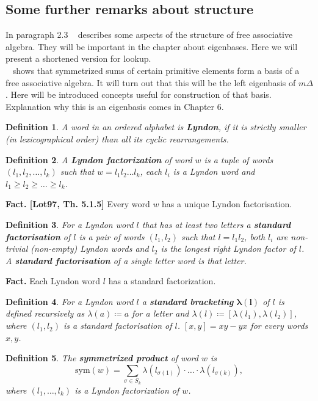 \documentclass[a4paper, 12pt]{article}
\newtheorem{definition}{Definition}
\begin{document}
\subsection{Some further remarks about structure}
In paragraph 2.3 ~\cite{Diaconis2014} describes some aspects of the structure of free associative algebra.
They will be important in the chapter about eigenbases. Here we will present a shortened version for
 lookup.
 \\
~\cite{Garsia_auvancesin} shows that symmetrized sums of certain primitive elements form a basis of a free associative algebra.
It will turn out that this will be the left eigenbasis of $m\Delta$.
Here will be introduced concepts useful for
construction of that basis. Explanation why this is an eigenbasis comes in Chapter 6.
\begin{definition}
A word in an ordered alphabet is \textbf{Lyndon}, if it is strictly smaller (in lexicographical order)
 than all its cyclic rearrangements.
\end{definition}
\begin{definition}
A \textbf{Lyndon factorization} of word $w$ is a tuple of words $(l_1, l_2, \dots, l_k)$ such that
$w = l_1l_2\dots l_k$, each $l_i$ is a Lyndon word and $l_1 \geq l_2 \geq \dots \geq l_k$.
\end{definition}
\noindent\textbf{Fact. [Lot97, Th. 5.1.5]} Every word $w$ has a unique Lyndon factorisation.
\begin{definition}
For a Lyndon word $l$ that has at least two letters a \textbf{standard factorisation} of $l$ is a pair of
words $(l_1, l_2)$ such that $l = l_1l_2$, both $l_i$ are non-trivial (non-empty) Lyndon words and $l_2$
is the longest right Lyndon factor of $l$. A \textbf{standard factorisation} of a single letter word is that
letter.
\end{definition}
\noindent\textbf{Fact.} Each Lyndon word $l$ has a standard factorization.
\begin{definition}
For a Lyndon word $l$ a \textbf{standard bracketing} $\boldsymbol{\lambda(l)}$ of $l$ is defined recursively
as
$\lambda(a) \coloneqq a$ for a letter and $\lambda(l) \coloneqq [\lambda(l_1), \lambda(l_2)]$, where $(l_1,
l_2)$
is a standard factorisation of $l$. $[x, y] = xy - yx$ for every words $x, y$.
\end{definition}
\begin{definition}
The \textbf{symmetrized product} of word $w$ is
\begin{equation*}
\mathrm{sym}(w) = \sum_{\sigma \in S_k} \lambda(l_{\sigma(1)})\cdot\ldots\cdot\lambda(l_{\sigma(k)}),
\end{equation*}
where $(l_1, \dots, l_k)$ is a Lyndon factorization of $w$.
\end{definition}
\end{document}
